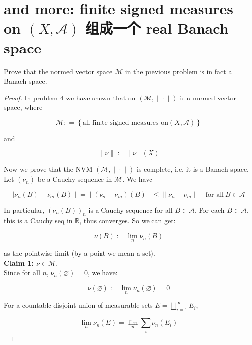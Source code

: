 \section{\texorpdfstring{and more: finite signed measures on \((X,\mathcal{A})\) 组成一个 real Banach space}{and more: finite signed measures on (X,\textbackslash mathcal\{A\}) 组成一个 real Banach space}}\label{and-more-finite-signed-measures-on-xmathcala-ux7ec4ux6210ux4e00ux4e2a-real-banach-space}

Prove that the normed vector space \(\mathcal{M}\) in the previous problem is in fact a Banach space.

\begin{proof}

In problem 4 we have shown that on \((\mathcal{M}, \parallel \cdot \parallel )\) is a normed vector space, where

\[\mathcal{M}: = \left\{ {\text{all finite signed measures on}(X,\mathcal{A})} \right\}\]

and

\[\left. \parallel \nu \parallel := \middle| \nu \middle| (X) \right.\]

Now we prove that the NVM \((\mathcal{M}, \parallel \cdot \parallel )\) is complete, i.e. it is a Banach space.\\
Let \((\nu_{n})\) be a Cauchy sequence in \(\mathcal{M}\). We have

\[\left. |\nu_{n}(B) - \nu_{m}(B) \middle| = \middle| (\nu_{n} - \nu_{m})(B) \middle| \leq \parallel \nu_{n} - \nu_{m} \parallel \quad\text{for all}\ B \in \mathcal{A} \right.\]

In particular, \((\nu_{n}(B))_{n}\) is a Cauchy sequence for all \(B \in \mathcal{A}\). For each \(B \in \mathcal{A}\), this is a Cauchy seq in \(\mathbb{R}\), thus converges. So we can get:

\[\nu(B) := \lim\limits_{n}\nu_{n}(B)\]

as the pointwise limit (by a point we mean a set).\\
\textbf{Claim 1: \(\nu \in \mathcal{M}\)}.\\
Since for all \(n\), \(\nu_{n}(\varnothing) = 0\), we have:

\[\nu(\varnothing) := \lim\limits_{n}\nu_{n}(\varnothing) = 0\]

For a countable disjoint union of measurable sets \(E = \bigsqcup_{i = 1}^{\infty}E_{i}\),

\[\lim\limits_{n}\nu_{n}(E) = \lim\limits_{n}\sum\limits_{i}\nu_{n}(E_{i})\]


\end{proof}
